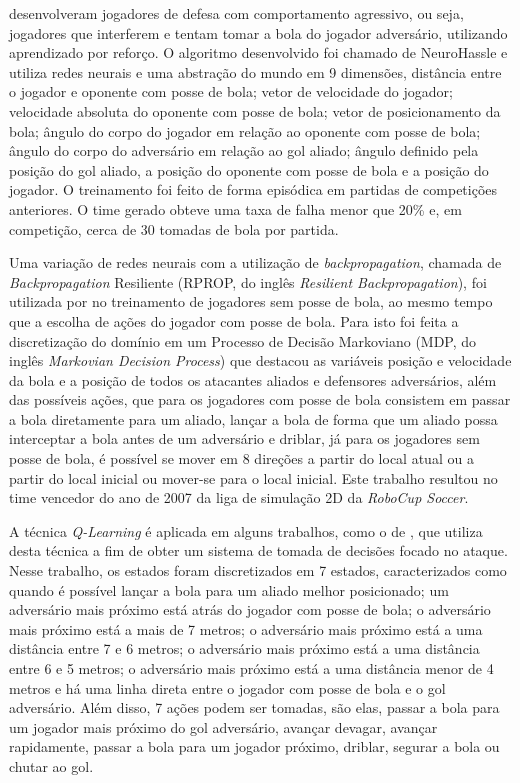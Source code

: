  desenvolveram jogadores de defesa com comportamento agressivo, ou seja,
jogadores que interferem e tentam tomar a bola do jogador adversário, utilizando aprendizado por
reforço. O algoritmo desenvolvido foi chamado de NeuroHassle e utiliza redes neurais e uma abstração
do mundo em 9 dimensões, distância entre o jogador e oponente com posse de bola; vetor de velocidade
do jogador; velocidade absoluta do oponente com posse de bola; vetor de posicionamento da bola;
ângulo do corpo do jogador em relação ao oponente com posse de bola; ângulo do corpo do adversário
em relação ao gol aliado; ângulo definido pela posição do gol aliado, a posição do oponente com
posse de bola e a posição do jogador. O treinamento foi feito de forma episódica em partidas de
competições anteriores. O time gerado obteve uma taxa de falha menor que 20\% e, em competição,
cerca de 30 tomadas de bola por partida.

Uma variação de redes neurais com a utilização de \textit{backpropagation}, chamada de
\textit{Backpropagation} Resiliente (RPROP, do inglês \textit{Resilient Backpropagation}), foi
utilizada por  no treinamento de jogadores sem posse de
bola, ao mesmo tempo que a escolha de ações do jogador com posse de bola. Para isto foi feita a
discretização do domínio em um Processo de Decisão Markoviano (MDP, do inglês \textit{Markovian
Decision Process}) que destacou as variáveis posição e velocidade da bola e a posição de todos os
atacantes aliados e defensores adversários, além das possíveis ações, que para os jogadores com
posse de bola consistem em passar a bola diretamente para um aliado, lançar a bola de forma que um
aliado possa interceptar a bola antes de um adversário e driblar, já para os jogadores sem posse de
bola, é possível se mover em 8 direções a partir do local atual ou a partir do local inicial ou
mover-se para o local inicial. Este trabalho resultou no time vencedor do ano de 2007 da liga de
simulação 2D da \textit{RoboCup Soccer}.

A técnica \textit{Q-Learning} é aplicada em alguns trabalhos, como o de
, que utiliza desta técnica a fim de obter um sistema de tomada de
decisões focado no ataque. Nesse trabalho, os estados foram discretizados em 7 estados,
caracterizados como quando é possível lançar a bola para um aliado melhor posicionado; um adversário
mais próximo está atrás do jogador com posse de bola; o adversário mais próximo está a mais de 7
metros; o adversário mais próximo está a uma distância entre 7 e 6 metros; o adversário mais próximo
está a uma distância entre 6 e 5 metros; o adversário mais próximo está a uma distância menor de 4
metros e há uma linha direta entre o jogador com posse de bola e o gol adversário. Além disso, 7
ações podem ser tomadas, são elas, passar a bola para um jogador mais próximo do gol adversário,
avançar devagar, avançar rapidamente, passar a bola para um jogador próximo, driblar, segurar a bola
ou chutar ao gol.

